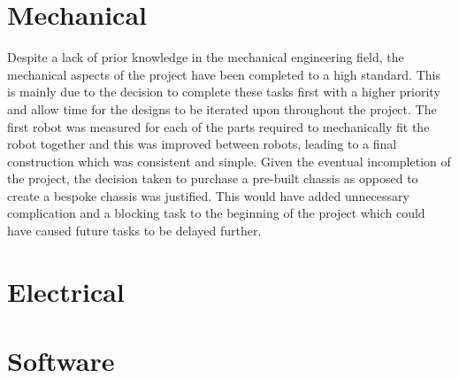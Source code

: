 \section{Mechanical}\label{eval/mech}
Despite a lack of prior knowledge in the mechanical engineering field, the mechanical aspects of the project have been completed to a 
high standard. This is mainly due to the decision to complete these tasks first with a higher priority and allow time for the designs to 
be iterated upon throughout the project. The first robot was measured for each of the parts required to mechanically fit the robot 
together and this was improved between robots, leading to a final construction which was consistent and simple. Given the eventual 
incompletion of the project, the decision taken to purchase a pre-built chassis as opposed to create a bespoke chassis was justified. 
This would have added unnecessary complication and a blocking task to the beginning of the project which could have caused future tasks 
to be delayed further. 



\section{Electrical}\label{eval/elec}

\section{Software}\label{eval/soft}
\todo{}
